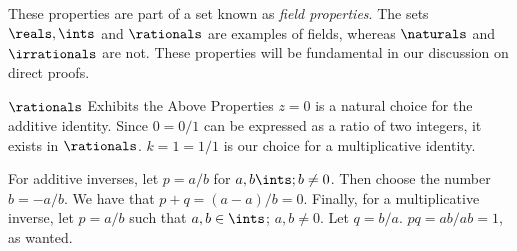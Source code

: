 These properties are part of a set known as \emph{field properties}. The sets 
$\reals, \ints$ and $\rationals$ are examples of fields, whereas $\naturals$
and $\irrationals$ are not. These properties will be fundamental in our
discussion on direct proofs.

\begin{expl}{$\rationals$ Exhibits the Above Properties}
  $z = 0$ is a natural choice for the additive identity. Since $0 = 0/1$ can
  be expressed as a ratio of two integers, it exists in $\rationals$. $k = 1 = 1/1$
  is our choice for a multiplicative identity.

  For additive inverses, let $p = a/b$ for $a, b \ints; b \neq 0$. Then choose
  the number $b = -a/b$. We have that $p + q = (a - a)/b = 0$. Finally, for 
  a multiplicative inverse, let $p = a/b$ such that $a, b \in \ints$;
  $a, b \neq 0$. Let $q = b/a$. $pq = ab/ab = 1$, as wanted.
\end{expl}

